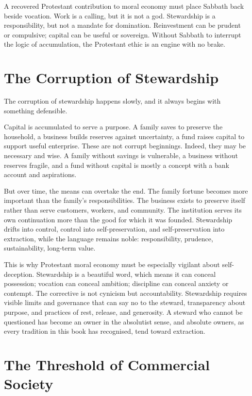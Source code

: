 \documentclass[11pt,a4paper,oneside]{book}
\begin{document}
A recovered Protestant contribution to moral economy must place Sabbath back beside vocation. Work is a calling, but it is not a god. Stewardship is a responsibility, but not a mandate for domination. Reinvestment can be prudent or compulsive; capital can be useful or sovereign. Without Sabbath to interrupt the logic of accumulation, the Protestant ethic is an engine with no brake.

\section*{The Corruption of Stewardship}

The corruption of stewardship happens slowly, and it always begins with something defensible.

Capital is accumulated to serve a purpose. A family saves to preserve the household, a business builds reserves against uncertainty, a fund raises capital to support useful enterprise. These are not corrupt beginnings. Indeed, they may be necessary and wise. A family without savings is vulnerable, a business without reserves fragile, and a fund without capital is mostly a concept with a bank account and aspirations.

But over time, the means can overtake the end. The family fortune becomes more important than the family's responsibilities. The business exists to preserve itself rather than serve customers, workers, and community. The institution serves its own continuation more than the good for which it was founded. Stewardship drifts into control, control into self-preservation, and self-preservation into extraction, while the language remains noble: responsibility, prudence, sustainability, long-term value.

This is why Protestant moral economy must be especially vigilant about self-deception. Stewardship is a beautiful word, which means it can conceal possession; vocation can conceal ambition; discipline can conceal anxiety or contempt. The corrective is not cynicism but accountability. Stewardship requires visible limits and governance that can say no to the steward, transparency about purpose, and practices of rest, release, and generosity. A steward who cannot be questioned has become an owner in the absolutist sense, and absolute owners, as every tradition in this book has recognised, tend toward extraction.

\section*{The Threshold of Commercial Society}
\end{document}

